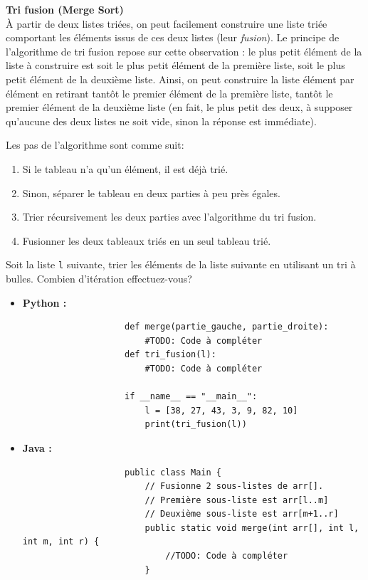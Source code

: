 \begin{Exercice} [30 minutes] \textbf{Tri fusion (Merge Sort)} \\
    À partir de deux listes triées, on peut facilement construire une liste triée comportant les éléments issus de ces deux listes (leur \textit{fusion}). Le principe de l'algorithme de tri fusion repose sur cette observation : le plus petit élément de la liste à construire est soit le plus petit élément de la première liste, soit le plus petit élément de la deuxième liste. Ainsi, on peut construire la liste élément par élément en retirant tantôt le premier élément de la première liste, tantôt le premier élément de la deuxième liste (en fait, le plus petit des deux, à supposer qu'aucune des deux listes ne soit vide, sinon la réponse est immédiate). 
    
    Les pas de l'algorithme sont comme suit:
    \begin{enumerate}
        \item Si le tableau n'a qu'un élément, il est déjà trié.
        \item Sinon, séparer le tableau en deux parties à peu près égales.
        \item Trier récursivement les deux parties avec l'algorithme du tri fusion.
        \item Fusionner les deux tableaux triés en un seul tableau trié.
    \end{enumerate}
    
    Soit la liste \lstinline{l} suivante, trier les éléments de la liste suivante en utilisant un tri à bulles. Combien d'itération effectuez-vous?
    
    \begin{itemize}
        \item \textbf{Python :}
                \begin{verbatim}
                    def merge(partie_gauche, partie_droite):
                        #TODO: Code à compléter
                    def tri_fusion(l):
                        #TODO: Code à compléter
                    
                    if __name__ == "__main__":
                        l = [38, 27, 43, 3, 9, 82, 10]
                        print(tri_fusion(l))
                \end{verbatim}
        \item \textbf{Java :}
                \begin{verbatim}
                    public class Main {
                        // Fusionne 2 sous-listes de arr[]. 
                        // Première sous-liste est arr[l..m] 
                        // Deuxième sous-liste est arr[m+1..r] 
                        public static void merge(int arr[], int l, int m, int r) {
                            //TODO: Code à compléter 
                        }
                        

\end{verbatim}
\end{itemize}
\end{Exercice}

